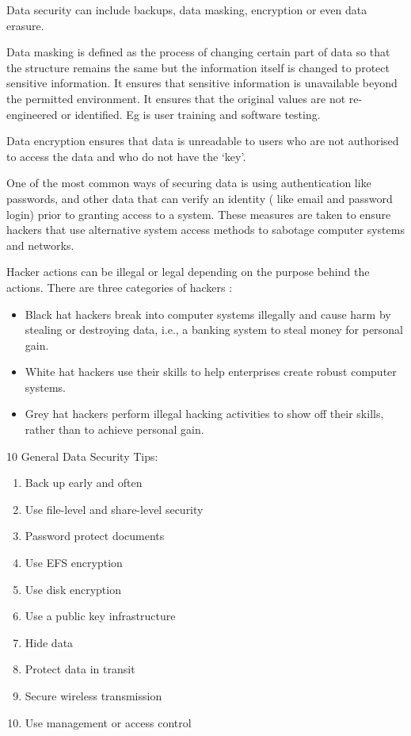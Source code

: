 \documentclass[]{book}
\providecommand{\tightlist}{%
  \setlength{\itemsep}{0pt}\setlength{\parskip}{0pt}}
\theoremstyle{definition}
\theoremstyle{definition}
\theoremstyle{remark}
\begin{document}
Data security can include backups, data masking, encryption or even data
erasure.

Data masking is defined as the process of changing certain part of data
so that the structure remains the same but the information itself is
changed to protect sensitive information. It ensures that sensitive
information is unavailable beyond the permitted environment. It ensures
that the original values are not re-engineered or identified. Eg is user
training and software testing.

Data encryption ensures that data is unreadable to users who are not
authorised to access the data and who do not have the `key'.

One of the most common ways of securing data is using authentication
like passwords, and other data that can verify an identity ( like email
and password login) prior to granting access to a system. These measures
are taken to ensure hackers that use alternative system access methods
to sabotage computer systems and networks.

Hacker actions can be illegal or legal depending on the purpose behind
the actions. There are three categories of hackers :

\begin{itemize}
\tightlist
\item
  Black hat hackers break into computer systems illegally and cause harm
  by stealing or destroying data, i.e., a banking system to steal money
  for personal gain.
\item
  White hat hackers use their skills to help enterprises create robust
  computer systems.
\item
  Grey hat hackers perform illegal hacking activities to show off their
  skills, rather than to achieve personal gain.
\end{itemize}

10 General Data Security Tips:

\begin{enumerate}
\def\labelenumi{\arabic{enumi}.}
\tightlist
\item
  Back up early and often
\item
  Use file-level and share-level security
\item
  Password protect documents
\item
  Use EFS encryption
\item
  Use disk encryption
\item
  Use a public key infrastructure
\item
  Hide data
\item
  Protect data in transit
\item
  Secure wireless transmission
\item
  Use management or access control
\end{enumerate}
\end{document}
